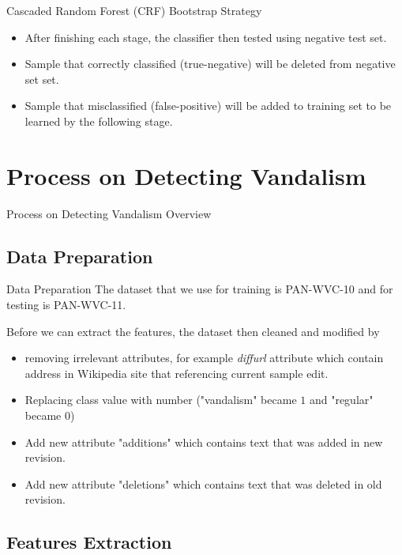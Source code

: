 \documentclass{beamer}
\begin{document}
\begin{frame}
	{Cascaded Random Forest (CRF)}
	{Bootstrap Strategy}
	\begin{itemize}
		\item After finishing each stage, the classifier then tested using negative
		test set.
		\item Sample that correctly classified (true-negative) will be
		deleted from negative set set.
		\item Sample that misclassified (false-positive) will be added to
		training set to be learned by the following stage.
	\end{itemize}
\end{frame}


\section{Process on Detecting Vandalism}

\begin{frame}
	{Process on Detecting Vandalism}
	{Overview}
	
\end{frame}

\subsection{Data Preparation}

\begin{frame}{Data Preparation}
	The dataset that we use for training is PAN-WVC-10 and for
	testing is PAN-WVC-11.

	Before we can extract the features, the dataset then cleaned and
	modified by
	\begin{itemize}
	\item removing irrelevant attributes, for example \textit{diffurl}
	attribute which contain address in Wikipedia site that referencing current
	sample edit.
	\item Replacing class value with number ("vandalism" became $1$
	and "regular" became $0$)
	\item Add new attribute "additions" which contains text that was added in
	new revision.
	\item Add new attribute "deletions" which contains text that was deleted in
	old revision.
	\end{itemize}
\end{frame}

\subsection{Features Extraction}
\end{document}
